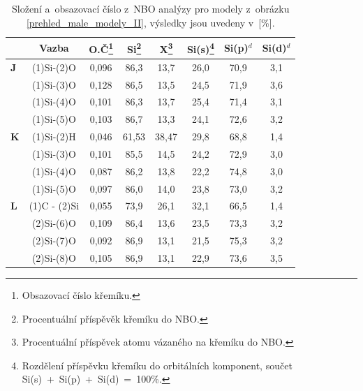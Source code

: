 \documentclass[
digital, %
table,   %
lof,     %
lot,     %
oneside,
]{fithesis3}
\begin{document}
\begin{table}[H]
\caption{Složení a~obsazovací číslo z~NBO analýzy pro modely z~obrázku \ref{prehled_male_modely_II}, výsledky jsou uvedeny v~[\%].}
\begin{minipage}{\textwidth}
\begin{center}
\begin{tabular}{|l|c|c|c|c|c|c|c|}
\hline\label{nbo_reaktanty_porovnani}&  Vazba & O.Č\footnote{Obsazovací číslo křemíku.} & Si\footnote{Procentuální příspěvěk křemíku do NBO.} & X\footnote{Procentuální příspěvek atomu vázaného na křemíku do NBO.} & Si(s)\footnote{Rozdělení příspěvku křemíku do orbitálních komponent, součet Si(s)~+~Si(p)~+~Si(d)~=~100\%.} & Si(p)$^d$ &Si(d)$^d$ \\ \hline
\textbf{J} & (1)Si-(2)O & 0,096 & 86,3  & 13,7  & 26,0  & 70,9  & 3,1  \\ \hline
& (1)Si-(3)O & 0,128 & 86,5  & 13,5  & 24,5  & 71,9  & 3,6  \\ \hline
& (1)Si-(4)O & 0,101 & 86,3  & 13,7  & 25,4  & 71,4  & 3,1  \\ \hline
& (1)Si-(5)O & 0,103 & 86,7  & 13,3  & 24,1  & 72,6  & 3,2  \\ \hline

\textbf{K} & (1)Si-(2)H & 0,046 & 61,53  & 38,47  & 29,8  & 68,8  & 1,4  \\ \hline
& (1)Si-(3)O & 0,101 & 85,5  & 14,5  & 24,2  & 72,9  & 3,0  \\ \hline
& (1)Si-(4)O & 0,087 & 86,2  & 13,8  & 22,2  & 74,8  & 3,0  \\ \hline
& (1)Si-(5)O & 0,097 & 86,0  & 14,0  & 23,8  & 73,0  & 3,2  \\ \hline
\textbf{L} & (1)C - (2)Si & 0,055 & 73,9  & 26,1  & 32,1  & 66,5  & 1,4  \\ \hline
& (2)Si-(6)O & 0,109 & 86,4  & 13,6  & 23,5  & 73,3  & 3,2  \\ \hline
& (2)Si-(7)O & 0,092 & 86,9  & 13,1  & 21,5  & 75,3  & 3,2  \\ \hline
& (2)Si-(8)O & 0,105 & 86,9  & 13,1  & 22,9  & 73,6  & 3,5  \\ \hline
\end{tabular}
\end{center}\end{minipage}\end{table}
\end{document}
